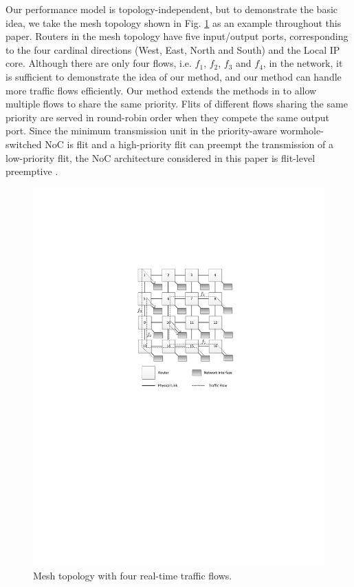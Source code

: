 \documentclass[preprint]{elsarticle}
\begin{document}
Our performance model is topology-independent, but to demonstrate the basic idea, we take the mesh topology shown in Fig. \ref{topology} as an example throughout this paper. Routers in the mesh topology have five input/output ports, corresponding to the four cardinal directions (West, East, North and South) and the Local IP core. Although there are only four flows, i.e. $f_1$, $f_2$, $f_3$ and $f_4$, in the network, it is sufficient to demonstrate the idea of our method, and our method can handle more traffic flows efficiently. Our method extends the methods in \cite{73}\cite{Qian489900} to allow multiple flows to share the same priority. Flits of different flows sharing the same priority are served in round-robin order when they compete the same output port. Since the minimum transmission unit in the priority-aware wormhole-switched NoC is flit and a high-priority flit can preempt the transmission of a low-priority flit, the NoC architecture considered in this paper is flit-level preemptive \cite{Lee:2003:RWC:846077.846083}.
\begin{figure}
  \centering
  \includegraphics[scale=0.85]{figures/mesh.pdf}
  \caption{Mesh topology with four real-time traffic flows.}\label{topology}
\end{figure}
\end{document}
